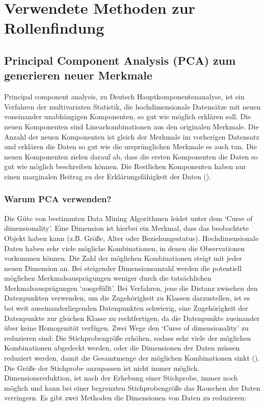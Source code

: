 \documentclass[envcountsame, envcountchap, deutsch]{i-studis}
\begin{document}

\chapter{Verwendete Methoden zur Rollenfindung}
\section{Principal Component Analysis (PCA) zum generieren neuer Merkmale}
Principal component analysis, zu Deutsch Hauptkomponentenanalyse, ist ein Verfahren der multivariaten Statistik, die hochdimensionale Datensätze mit neuen voneinander 
unabhängigen Komponenten, so gut wie möglich erklären soll. Die neuen Komponenten sind Linearkombinationen aus den originalen Merkmale.
Die Anzahl der neuen Komponenten ist gleich der Merkmale im vorherigen Datensatz und erklären die Daten so gut wie die ursprünglichen 
Merkmale es auch tun. Die neuen Komponenten zielen darauf ab, dass die ersten Komponenten die Daten so gut wie möglich beschreiben können. Die Restlichen Komponenten haben nur einen 
marginalen Beitrag zu der Erklärungsfähigkeit der Daten (\cite[p.2]{Lavrenko_Sutton_2011_pca}).

\subsection{Warum PCA verwenden?}
Die Güte von bestimmten Data Mining Algorithmen leidet unter dem `Curse of dimensionality'. Eine Dimension ist hierbei ein Merkmal, dass das beobachtete Objekt haben kann 
(z.B. Größe, Alter oder Beziehungsstatus). Hochdimensionale Daten haben sehr viele mögliche Kombinationen, in denen die Observationen vorkommen können. 
Die Zahl der möglichen Kombinationen steigt mit jeder neuen Dimension an. 
Bei steigender Dimensionsanzahl werden die potentiell möglichen Merkmalsausprägungen weniger durch die tatsächlichen Merkmalsausprägungen `ausgefüllt'. 
Bei Verfahren, jene die Distanz zwischen den Datenpunkten verwenden, um die Zugehörigkeit zu Klassen darzustellen, ist es bei weit auseinanderliegenden Datenpunkten schwierig, eine
Zugehörigkeit der Datenpunkte zur gleichen Klasse zu rechtfertigen, da die Datenpunkte zueinander über keine Homogenität verfügen.
Zwei Wege den `Curse of dimensionality' zu reduzieren sind: Die Stichprobengröße erhöhen, sodass sehr viele der 
möglichen Kombinationen abgedeckt werden, oder die Dimensionen der Daten müssen reduziert werden, damit die Gesamtmenge der möglichen Kombinationen sinkt (\cite{Altman_Krzywinski_2018}).
Die Größe der Stichprobe anzupassen ist nicht immer möglich. Dimensionsreduktion, ist nach der Erhebung einer Stichprobe, immer noch möglich und kann 
bei einer begrenzten Stichprobengröße das Rauschen der Daten verringern. Es gibt zwei Methoden die Dimensionen von Daten zu reduzieren:
\end{document}
